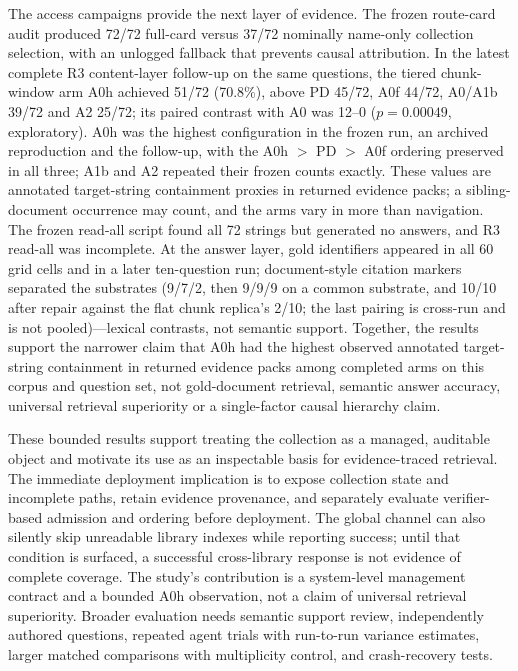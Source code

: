 \documentclass[11pt]{article}
\begin{document}
The access campaigns provide the next layer of evidence. The frozen route-card
audit produced 72/72 full-card versus 37/72 nominally name-only collection
selection, with an unlogged fallback that prevents causal attribution. In the
latest complete R3 content-layer follow-up on the same questions, the tiered
chunk-window arm A0h achieved 51/72 (70.8\%), above PD 45/72, A0f 44/72, A0/A1b 39/72 and A2 25/72; its paired
contrast with A0 was 12--0 ($p=0.00049$, exploratory). A0h was the highest
configuration in the frozen run, an archived reproduction and the follow-up,
with the A0h $>$ PD $>$ A0f ordering preserved in all three; A1b and A2
repeated their frozen counts exactly. These values are annotated target-string containment proxies in returned
evidence packs; a sibling-document occurrence may count, and the arms vary in
more than navigation.
The frozen read-all script found all 72 strings but generated no answers, and
R3 read-all was incomplete. At the answer layer, gold identifiers appeared in
all 60 grid cells and in a later ten-question run; document-style citation
markers separated the substrates (9/7/2, then 9/9/9 on a common substrate,
and 10/10 after repair against the flat chunk replica's 2/10; the last
pairing is cross-run and is not pooled)---lexical
contrasts, not semantic support. Together, the results support the narrower
claim that A0h had the highest observed annotated target-string containment in
returned evidence packs among completed arms on this corpus and question set,
not gold-document retrieval, semantic answer accuracy, universal retrieval
superiority or a single-factor causal hierarchy claim.

These bounded results support treating the collection as a managed, auditable
object and motivate its use as an inspectable basis for evidence-traced
retrieval. The immediate deployment implication is to expose collection state
and incomplete paths, retain evidence provenance, and separately evaluate
verifier-based admission and ordering before deployment. The global channel can also
silently skip unreadable library indexes while reporting success; until that
condition is surfaced, a successful cross-library response is not evidence of
complete coverage. The study's contribution is a system-level management
contract and a bounded A0h observation, not a claim of universal retrieval
superiority. Broader evaluation needs semantic support review, independently
authored questions, repeated agent trials with run-to-run variance estimates,
larger matched comparisons with multiplicity control, and crash-recovery tests.
\end{document}
